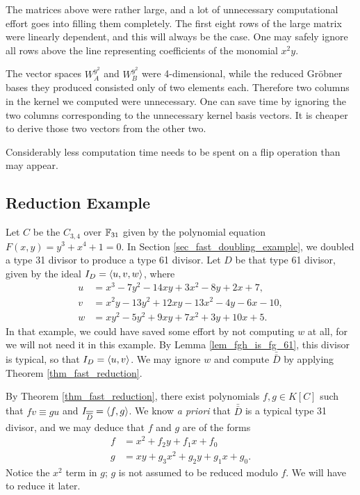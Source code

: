 \begin{remark}
  The matrices above were rather large,
  and a lot of unnecessary computational effort goes into filling them completely.
  The first eight rows of the large matrix were linearly dependent, and this will always be the case.
  One may safely ignore all rows above the line representing coefficients of the monomial $x^2y$.
  
  The vector spaces $W_A^{y^2}$ and $W_B^{y^2}$ were 4-dimensional,
  while the reduced Gr\"obner bases they produced consisted only of two elements each.
  Therefore two columns in the kernel we computed were unnecessary.
  One can save time by ignoring the two columns corresponding to the unnecessary kernel basis vectors.
  It is cheaper to derive those two vectors from the other two.
  
  Considerably less computation time needs to be spent on a flip operation than may appear.
\end{remark}




\subsection{Reduction Example}
\label{sec_reduction_example}

Let $C$ be the $C_{3,4}$ over $\mathbb{F}_{31}$ given by the polynomial equation $F(x,y) = y^3 + x^4 + 1 = 0$.
In Section \ref{sec_fast_doubling_example}, we doubled a type 31 divisor to produce a type 61 divisor.
Let $D$ be that type 61 divisor, given by the ideal $I_D = \left\langle u,v,w \right\rangle$, where
\begin{align*}
  u &=  x^3 -  7y^2 - 14xy +  3x^2 - 8y +  2x +  7, \\
  v &= x^2y - 13y^2 + 12xy - 13x^2 - 4y -  6x - 10, \\
  w &= xy^2 -  5y^2 +  9xy +  7x^2 + 3y + 10x +  5.
\end{align*}
In that example, we could have saved some effort by not computing $w$ at all, for we will not need it in this example.
By Lemma \ref{lem_fgh_is_fg_61}, this divisor is typical, so that $I_D = \left\langle u,v \right\rangle$.
We may ignore $w$ and compute $\bar{\bar D}$ by applying Theorem \ref{thm_fast_reduction}.

By Theorem \ref{thm_fast_reduction},
there exist polynomials $f, g \in K[C]$ such that $fv \equiv gu$ and $I_{\overline{\overline D}} = \left\langle f,g \right\rangle$.
We know \emph{a priori} that $\bar{\bar D}$ is a typical type 31 divisor,
and we may deduce that $f$ and $g$ are of the forms
\begin{align*}
  f &= x^2 + f_2y + f_1x + f_0 \\
  g &= xy + g_3x^2 + g_2y + g_1x + g_0.
\end{align*}
Notice the $x^2$ term in $g$; $g$ is not assumed to be reduced modulo $f$.
We will have to reduce it later.

